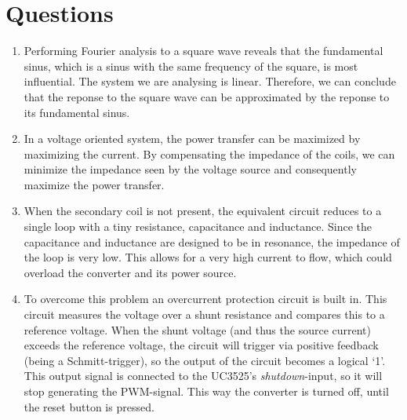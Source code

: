 \documentclass[11pt,titlepage]{report}
\begin{document}
\section*{Questions}
\begin{enumerate}
\item
Performing Fourier analysis to a square wave reveals that the fundamental sinus, which is a sinus with the same frequency of the square, is most influential. The system we are analysing is linear. Therefore, we can conclude that the reponse to the square wave can be approximated by the reponse to its fundamental sinus.

\item
In a voltage oriented system, the power transfer can be maximized by maximizing the current. By compensating the impedance of the coils, we can minimize the impedance seen by the voltage source and consequently maximize the power transfer.

\item
When the secondary coil is not present, the equivalent circuit reduces to a single loop with a tiny resistance, capacitance and inductance. Since the capacitance and inductance are designed to be in resonance, the impedance of the loop is very low. This allows for a very high current to flow, which could overload the converter and its power source.

\item
To overcome this problem an overcurrent protection circuit is built in. This circuit measures the voltage over a shunt resistance and compares this to a reference voltage. When the shunt voltage (and thus the source current) exceeds the reference voltage, the circuit will trigger via positive feedback (being a Schmitt-trigger), so the output of the circuit becomes a logical `1'. This output signal is connected to the UC3525's \textit{shutdown}-input, so it will stop generating the PWM-signal. This way the converter is turned off, until the reset button is pressed.
\end{enumerate}
\end{document}
